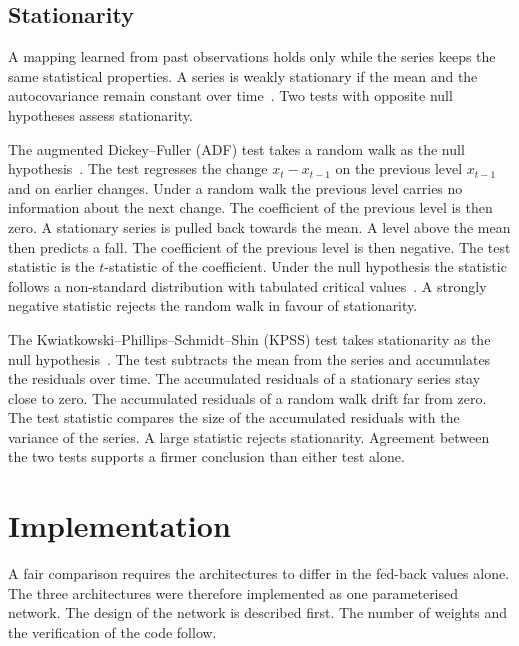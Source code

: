 \documentclass[conference,10pt]{IEEEtran}
\begin{document}
\subsection{Stationarity}

A mapping learned from past observations holds only while the series
keeps the same statistical properties.
A series is weakly stationary if the mean and the autocovariance remain
constant over time~\cite{hyndman2021}.
Two tests with opposite null hypotheses assess stationarity.

The augmented Dickey--Fuller (ADF) test takes a random walk as the null
hypothesis~\cite{said1984}.
The test regresses the change $x_t - x_{t-1}$ on the previous level
$x_{t-1}$ and on earlier changes.
Under a random walk the previous level carries no information about the
next change.
The coefficient of the previous level is then zero.
A stationary series is pulled back towards the mean.
A level above the mean then predicts a fall.
The coefficient of the previous level is then negative.
The test statistic is the $t$-statistic of the coefficient.
Under the null hypothesis the statistic follows a non-standard
distribution with tabulated critical values~\cite{said1984}.
A strongly negative statistic rejects the random walk in favour of
stationarity.

The Kwiatkowski--Phillips--Schmidt--Shin (KPSS) test takes stationarity
as the null hypothesis~\cite{kwiatkowski1992}.
The test subtracts the mean from the series and accumulates the
residuals over time.
The accumulated residuals of a stationary series stay close to zero.
The accumulated residuals of a random walk drift far from zero.
The test statistic compares the size of the accumulated residuals with
the variance of the series.
A large statistic rejects stationarity.
Agreement between the two tests supports a firmer conclusion than
either test alone.

\section{Implementation}
\label{sec:implementation}
A fair comparison requires the architectures to differ in the fed-back
values alone.
The three architectures were therefore implemented as one parameterised
network.
The design of the network is described first.
The number of weights and the verification of the code follow.
\end{document}
